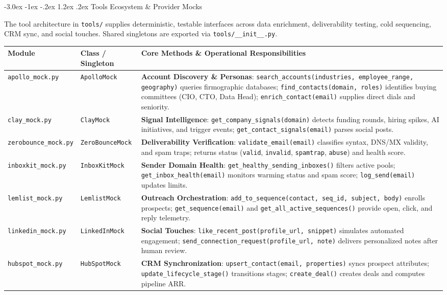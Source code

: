 \documentclass[10pt,letterpaper]{article}
\makeatletter
\renewcommand{\section}{\@startsection{section}{1}{\z@}%
  {-3.0ex \@plus -1ex \@minus -.2ex}%
  {1.2ex \@plus .2ex}%
  {\normalfont\large\bfseries\color{branddark}}}
\makeatother
\begin{document}
\section{Tools Ecosystem \& Provider Mocks}

The tool architecture in \texttt{tools/} supplies deterministic, testable interfaces across data enrichment, deliverability testing, cold sequencing, CRM sync, and social touches. Shared singletons are exported via \texttt{tools/\_\_init\_\_.py}.

\begin{table}[h!]
\centering
\scriptsize
\begin{tabularx}{\textwidth}{l p{2.8cm} X}
\toprule
\textbf{Module} & \textbf{Class / Singleton} & \textbf{Core Methods \& Operational Responsibilities} \\
\midrule
\texttt{apollo\_mock.py} & \texttt{ApolloMock} & \textbf{Account Discovery \& Personas}: \texttt{search\_accounts(industries, employee\_range, geography)} queries firmographic databases; \texttt{find\_contacts(domain, roles)} identifies buying committees (CIO, CTO, Data Head); \texttt{enrich\_contact(email)} supplies direct dials and seniority. \\
\texttt{clay\_mock.py} & \texttt{ClayMock} & \textbf{Signal Intelligence}: \texttt{get\_company\_signals(domain)} detects funding rounds, hiring spikes, AI initiatives, and trigger events; \texttt{get\_contact\_signals(email)} parses social posts. \\
\texttt{zerobounce\_mock.py} & \texttt{ZeroBounceMock} & \textbf{Deliverability Verification}: \texttt{validate\_email(email)} classifies syntax, DNS/MX validity, and spam traps; returns status (\texttt{valid}, \texttt{invalid}, \texttt{spamtrap}, \texttt{abuse}) and health score. \\
\texttt{inboxkit\_mock.py} & \texttt{InboxKitMock} & \textbf{Sender Domain Health}: \texttt{get\_healthy\_sending\_inboxes()} filters active pools; \texttt{get\_inbox\_health(email)} monitors warming status and spam score; \texttt{log\_send(email)} updates limits. \\
\texttt{lemlist\_mock.py} & \texttt{LemlistMock} & \textbf{Outreach Orchestration}: \texttt{add\_to\_sequence(contact, seq\_id, subject, body)} enrolls prospects; \texttt{get\_sequence(email)} and \texttt{get\_all\_active\_sequences()} provide open, click, and reply telemetry. \\
\texttt{linkedin\_mock.py} & \texttt{LinkedInMock} & \textbf{Social Touches}: \texttt{like\_recent\_post(profile\_url, snippet)} simulates automated engagement; \texttt{send\_connection\_request(profile\_url, note)} delivers personalized notes after human review. \\
\texttt{hubspot\_mock.py} & \texttt{HubSpotMock} & \textbf{CRM Synchronization}: \texttt{upsert\_contact(email, properties)} syncs prospect attributes; \texttt{update\_lifecycle\_stage()} transitions stages; \texttt{create\_deal()} creates deals and computes pipeline ARR. \\
\bottomrule
\end{tabularx}
\end{table}
\end{document}
